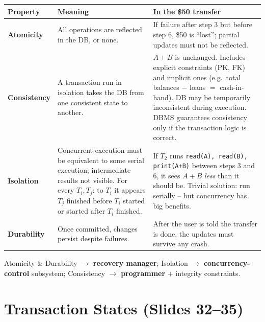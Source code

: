 \documentclass[10pt,a4paper]{article}
\begin{document}
\begin{tabularx}{\linewidth}{@{}p{2.3cm} X X@{}}
\toprule
\textbf{Property} & \textbf{Meaning} & \textbf{In the \$50 transfer}\\\midrule
\textbf{Atomicity} & All operations are reflected in the DB, or none. & If failure after step 3 but before step 6, \$50 is ``lost''; partial updates must not be reflected.\\
\textbf{Consistency} & A transaction run in isolation takes the DB from one consistent state to another. & $A+B$ is unchanged. Includes explicit constraints (PK, FK) and implicit ones (e.g.\ total balances $-$ loans $=$ cash-in-hand). DB may be temporarily inconsistent during execution. DBMS guarantees consistency only if the transaction logic is correct.\\
\textbf{Isolation} & Concurrent execution must be equivalent to some serial execution; intermediate results not visible. For every $T_i,T_j$: to $T_i$ it appears $T_j$ finished before $T_i$ started or started after $T_i$ finished. & If $T_2$ runs \texttt{read(A), read(B), print(A+B)} between steps 3 and 6, it sees $A+B$ \emph{less} than it should be. Trivial solution: run serially -- but concurrency has big benefits.\\
\textbf{Durability} & Once committed, changes persist despite failures. & After the user is told the transfer is done, the updates must survive any crash.\\
\bottomrule
\end{tabularx}

\begin{keybox}
Atomicity \& Durability $\to$ \textbf{recovery manager}; Isolation $\to$ \textbf{concurrency-control} subsystem; Consistency $\to$ \textbf{programmer} + integrity constraints.
\end{keybox}

\section{Transaction States (Slides 32--35)}
\end{document}
